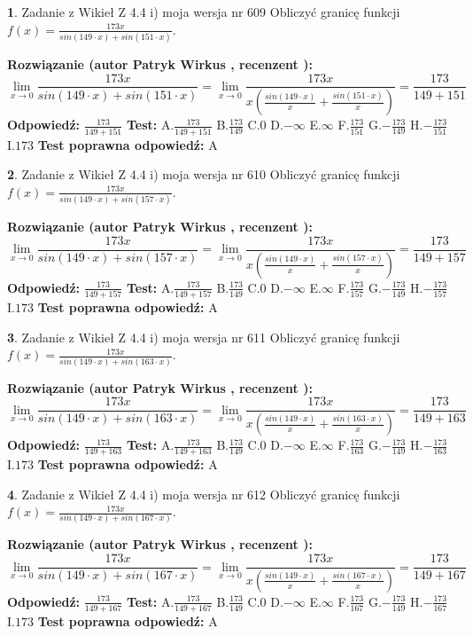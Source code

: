 \documentclass[12pt, a4paper]{article}
\theoremstyle{definition} %
\newtheorem{zad}{}
\newcommand{\zadStart}[1]{\begin{zad}#1\newline}
\newcommand{\zadStop}{\end{zad}}
\newcommand{\rozwStart}[2]{\noindent \textbf{Rozwiązanie (autor #1 , recenzent #2): }\newline}
\newcommand{\rozwStop}{\newline}
\newcommand{\odpStart}{\noindent \textbf{Odpowiedź:}\newline}
\newcommand{\odpStop}{\newline}
\newcommand{\testStart}{\noindent \textbf{Test:}\newline}
\newcommand{\testStop}{\newline}
\newcommand{\kluczStart}{\noindent \textbf{Test poprawna odpowiedź:}\newline}
\newcommand{\kluczStop}{\newline}
\begin{document}
\zadStart{Zadanie z Wikieł Z 4.4 i) moja wersja nr 609}
Obliczyć granicę funkcji $f(x)=\frac{173x}{sin(149\cdot x) +sin(151\cdot x)}$.
\zadStop
\rozwStart{Patryk Wirkus}{}
$$\lim\limits_{x\to 0}\frac{173x}{sin(149\cdot x) +sin(151\cdot x)}=\lim\limits_{x\to 0}\frac{173x}{x(\frac{sin(149\cdot x)}{x}+\frac{sin(151\cdot x)}{x})}=\frac{173}{149+151}$$
\rozwStop
\odpStart
$\frac{173}{149+151}$
\odpStop
\testStart
A.$\frac{173}{149+151}$
B.$\frac{173}{149}$
C.$0$
D.$-\infty$
E.$\infty$
F.$\frac{173}{151}$
G.$-\frac{173}{149}$
H.$-\frac{173}{151}$
I.$173$
\testStop
\kluczStart
A
\kluczStop



\zadStart{Zadanie z Wikieł Z 4.4 i) moja wersja nr 610}
Obliczyć granicę funkcji $f(x)=\frac{173x}{sin(149\cdot x) +sin(157\cdot x)}$.
\zadStop
\rozwStart{Patryk Wirkus}{}
$$\lim\limits_{x\to 0}\frac{173x}{sin(149\cdot x) +sin(157\cdot x)}=\lim\limits_{x\to 0}\frac{173x}{x(\frac{sin(149\cdot x)}{x}+\frac{sin(157\cdot x)}{x})}=\frac{173}{149+157}$$
\rozwStop
\odpStart
$\frac{173}{149+157}$
\odpStop
\testStart
A.$\frac{173}{149+157}$
B.$\frac{173}{149}$
C.$0$
D.$-\infty$
E.$\infty$
F.$\frac{173}{157}$
G.$-\frac{173}{149}$
H.$-\frac{173}{157}$
I.$173$
\testStop
\kluczStart
A
\kluczStop



\zadStart{Zadanie z Wikieł Z 4.4 i) moja wersja nr 611}
Obliczyć granicę funkcji $f(x)=\frac{173x}{sin(149\cdot x) +sin(163\cdot x)}$.
\zadStop
\rozwStart{Patryk Wirkus}{}
$$\lim\limits_{x\to 0}\frac{173x}{sin(149\cdot x) +sin(163\cdot x)}=\lim\limits_{x\to 0}\frac{173x}{x(\frac{sin(149\cdot x)}{x}+\frac{sin(163\cdot x)}{x})}=\frac{173}{149+163}$$
\rozwStop
\odpStart
$\frac{173}{149+163}$
\odpStop
\testStart
A.$\frac{173}{149+163}$
B.$\frac{173}{149}$
C.$0$
D.$-\infty$
E.$\infty$
F.$\frac{173}{163}$
G.$-\frac{173}{149}$
H.$-\frac{173}{163}$
I.$173$
\testStop
\kluczStart
A
\kluczStop



\zadStart{Zadanie z Wikieł Z 4.4 i) moja wersja nr 612}
Obliczyć granicę funkcji $f(x)=\frac{173x}{sin(149\cdot x) +sin(167\cdot x)}$.
\zadStop
\rozwStart{Patryk Wirkus}{}
$$\lim\limits_{x\to 0}\frac{173x}{sin(149\cdot x) +sin(167\cdot x)}=\lim\limits_{x\to 0}\frac{173x}{x(\frac{sin(149\cdot x)}{x}+\frac{sin(167\cdot x)}{x})}=\frac{173}{149+167}$$
\rozwStop
\odpStart
$\frac{173}{149+167}$
\odpStop
\testStart
A.$\frac{173}{149+167}$
B.$\frac{173}{149}$
C.$0$
D.$-\infty$
E.$\infty$
F.$\frac{173}{167}$
G.$-\frac{173}{149}$
H.$-\frac{173}{167}$
I.$173$
\testStop
\kluczStart
A
\kluczStop
\end{document}
